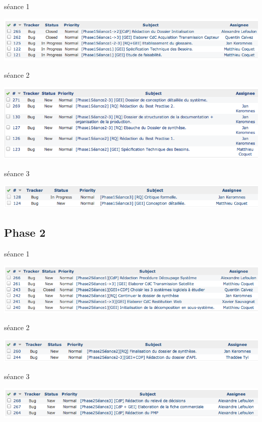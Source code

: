 séance 1 
\begin {center}
\includegraphics[width=\textwidth]{png/Phase1Seance1.png}
\end {center}
séance 2
\begin {center}
\includegraphics[width=\textwidth]{png/Phase1Seance2.png}
\end {center}
séance 3
\begin {center}
\includegraphics[width=\textwidth]{png/Phase1Seance3.png}
\end {center}
\subsection{Phase 2}
séance 1
\begin {center}
\includegraphics[width=\textwidth]{png/Phase2Seance1.png}
\end {center}
séance 2
\begin {center}
\includegraphics[width=\textwidth]{png/Phase2Seance2.png}
\end {center}
séance 3
\begin {center}
\includegraphics[width=\textwidth]{png/Phase2Seance3.png}
\end {center}

